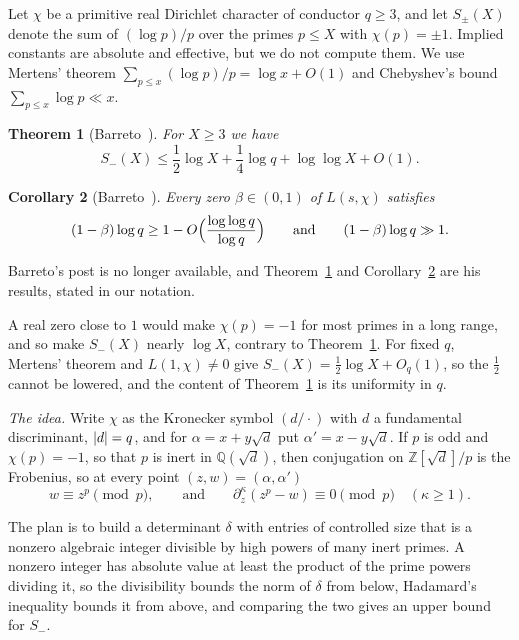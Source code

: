 \documentclass[11pt]{amsart}
\newtheorem{theorem}{Theorem}
\newtheorem{corollary}[theorem]{Corollary}
\theoremstyle{remark}
\newcommand{\Z}{\mathbb{Z}}
\newcommand{\Q}{\mathbb{Q}}
\newcommand{\sd}{\sqrt{d}}
\DeclarePairedDelimiter\abs{\lvert}{\rvert}
\begin{document}
Let $\chi$ be a primitive real Dirichlet character of conductor $q\ge3$, and let $S_\pm(X)$ denote
the sum of $(\log p)/p$ over the primes $p\le X$ with $\chi(p)=\pm1$. Implied constants are
absolute and effective, but we do not compute them. We use Mertens' theorem $\sum_{p\le x}(\log p)/p=\log x+O(1)$ and Chebyshev's
bound $\sum_{p\le x}\log p\ll x$.

\begin{theorem}[Barreto~\cite{Barreto}]\label{thm:main}
For $X\ge3$ we have
\[
S_-(X)\le\frac12\log X+\frac14\log q+\log\log X+O(1).
\]
\end{theorem}

\begin{corollary}[Barreto~\cite{Barreto}]\label{cor:siegel}
Every zero $\beta\in(0,1)$ of $L(s,\chi)$ satisfies
\[
(1-\beta)\log q\ge1-O\Bigl(\frac{\log\log q}{\log q}\Bigr)\qquad\textup{and}\qquad(1-\beta)\log q\gg1.
\]
\end{corollary}

Barreto's post is no longer available, and Theorem~\ref{thm:main} and Corollary~\ref{cor:siegel} are his
results, stated in our notation.


A real zero close to $1$ would make $\chi(p)=-1$ for most primes in a long range, and so make
$S_-(X)$ nearly $\log X$, contrary to Theorem~\ref{thm:main}. For fixed $q$, Mertens' theorem and
$L(1,\chi)\ne0$ give $S_-(X)=\frac12\log X+O_q(1)$, so the $\frac12$ cannot be lowered,
and the content of Theorem~\ref{thm:main} is its uniformity in $q$.

\emph{The idea.} Write $\chi$ as the Kronecker symbol $(d/\cdot)$ with $d$ a fundamental discriminant, $\abs{d}=q$, and for
$\alpha=x+y\sd$ put $\alpha'=x-y\sd$. If $p$ is odd and $\chi(p)=-1$, so that $p$ is inert
in $\Q(\sd)$, then conjugation on $\Z[\sd]/p$ is the Frobenius, so at every point $(z,w)=(\alpha,\alpha')$
\begin{equation}\label{eq:fact}
w\equiv z^p\pmod p,\qquad\text{and}\qquad\partial_z^\kappa(z^p-w)\equiv0\pmod p\quad(\kappa\ge1).
\end{equation}

The plan is to build a determinant $\delta$ with entries of controlled size that is a nonzero
algebraic integer divisible by high powers of many inert primes. A nonzero integer has absolute value at least the product of the
prime powers dividing it, so the divisibility bounds the norm of $\delta$ from below, Hadamard's
inequality bounds it from above, and comparing the two gives an upper bound for $S_-$.
\end{document}
